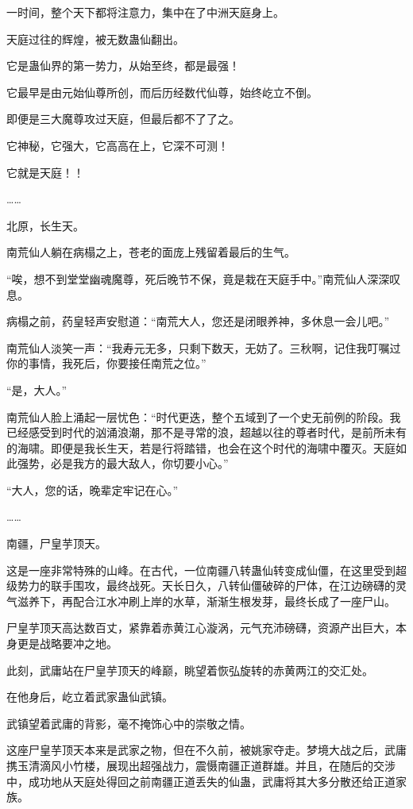 \begin{this_body}
一时间，整个天下都将注意力，集中在了中洲天庭身上。

天庭过往的辉煌，被无数蛊仙翻出。

它是蛊仙界的第一势力，从始至终，都是最强！

它最早是由元始仙尊所创，而后历经数代仙尊，始终屹立不倒。

即便是三大魔尊攻过天庭，但最后都不了了之。

它神秘，它强大，它高高在上，它深不可测！

它就是天庭！！

……

北原，长生天。

南荒仙人躺在病榻之上，苍老的面庞上残留着最后的生气。

“唉，想不到堂堂幽魂魔尊，死后晚节不保，竟是栽在天庭手中。”南荒仙人深深叹息。

病榻之前，药皇轻声安慰道：“南荒大人，您还是闭眼养神，多休息一会儿吧。”

南荒仙人淡笑一声：“我寿元无多，只剩下数天，无妨了。三秋啊，记住我叮嘱过你的事情，我死后，你要接任南荒之位。”

“是，大人。”

南荒仙人脸上涌起一层忧色：“时代更迭，整个五域到了一个史无前例的阶段。我已经感受到时代的汹涌浪潮，那不是寻常的浪，超越以往的尊者时代，是前所未有的海啸。即便是我长生天，若是行将踏错，也会在这个时代的海啸中覆灭。天庭如此强势，必是我方的最大敌人，你切要小心。”

“大人，您的话，晚辈定牢记在心。”

……

南疆，尸皇芋顶天。

这是一座非常特殊的山峰。在古代，一位南疆八转蛊仙转变成仙僵，在这里受到超级势力的联手围攻，最终战死。天长日久，八转仙僵破碎的尸体，在江边磅礴的灵气滋养下，再配合江水冲刷上岸的水草，渐渐生根发芽，最终长成了一座尸山。

尸皇芋顶天高达数百丈，紧靠着赤黄江心漩涡，元气充沛磅礴，资源产出巨大，本身更是战略要冲之地。

此刻，武庸站在尸皇芋顶天的峰巅，眺望着恢弘旋转的赤黄两江的交汇处。

在他身后，屹立着武家蛊仙武镇。

武镇望着武庸的背影，毫不掩饰心中的崇敬之情。

这座尸皇芋顶天本来是武家之物，但在不久前，被姚家夺走。梦境大战之后，武庸携玉清滴风小竹楼，展现出超强战力，震慑南疆正道群雄。并且，在随后的交涉中，成功地从天庭处得回之前南疆正道丢失的仙蛊，武庸将其大多分散还给正道家族。


\end{this_body}
